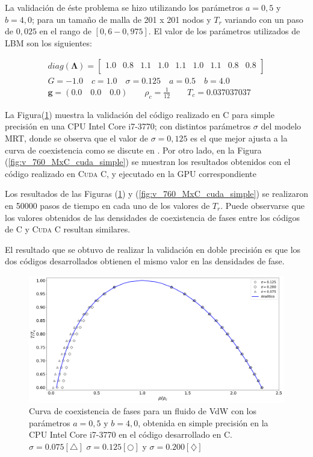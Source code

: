 La validación de éste problema se hizo utilizando los parámetros $a =0,5$ y $b = 4,0$; para un tamaño de malla de 201 x 201 nodos y $T_r$ variando con un paso de $0,025$ en el rango de $[0,6 - 0,975]$.  El valor de los parámetros utilizados de LBM son los siguientes:

\begin{align*}
diag(\mathbf{\Lambda}) = 
\begin{bmatrix}
1.0 & 0.8 & 1.1 & 1.0 & 1.1 & 1.0 & 1.1 & 0.8 & 0.8 \\
\end{bmatrix}\\
G = -1.0 \quad c = 1.0 \quad \sigma = 0.125 \quad a = 0.5 \quad b = 4.0 \\
\mathbf{g} = (0.0 \quad 0.0 \quad 0.0 ) \qquad \rho_c = \frac{1}{12} \qquad T_c = 0.037037037
\end{align*}

La Figura(\ref{fig:v_760_MxC_c_simple}) muestra la validación del código realizado en \textsc{C} para simple precisión en una CPU Intel Core i7-3770; con distintos parámetros $\sigma$ del modelo MRT, donde se observa que el valor de $\sigma = 0,125$ es el que mejor ajusta a la curva de coexistencia como se discute en \cite{fogliatto2018modelado}. Por otro lado, en la Figura (\ref{fig:v_760_MxC_cuda_simple}) se muestran los resultados obtenidos con el código realizado en \textsc{Cuda C}, y ejecutado en la GPU correspondiente

Los resultados de las Figuras (\ref{fig:v_760_MxC_c_simple}) y (\ref{fig:v_760_MxC_cuda_simple}) se realizaron en 50000 pasos de tiempo en cada uno de los valores de $T_r$. Puede observarse que los valores obtenidos de las densidades de coexistencia de fases entre los códigos de \textsc{C} y \textsc{Cuda C} resultan similares.

El resultado que se obtuvo de realizar la validación en doble precisión es que los dos códigos desarrollados obtienen el mismo valor en las densidades de fase.

\begin{figure}[h!]
	\centering
	\includegraphics[width=\textwidth]{figs/cap4/v_760_MxC_c_simple}
	\caption{Curva de coexistencia de fases para un fluido de VdW con los parámetros $a = 0,5 $ y $b = 4,0 $, obtenida en simple precisión en la CPU Intel Core i7-3770 en el código desarrollado en \textsc{C}. $\sigma = 0.075[\bigtriangleup]$	 $\sigma = 0.125[\bigcirc]$ y $\sigma = 0.200[\diamondsuit]$ }
 	\label{fig:v_760_MxC_c_simple}	
\end{figure}

